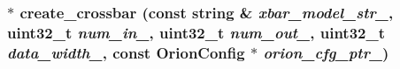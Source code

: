 \hypertarget{classCrossbar_afc72742e1283ea982ebdc5ef6ece81d2}{
\subsubsection[{create\_\-crossbar}]{ $\ast$ create\_\-crossbar (const string \& {\em xbar\_\-model\_\-str\_\-}, \/  {\bf uint32\_\-t} {\em num\_\-in\_\-}, \/  {\bf uint32\_\-t} {\em num\_\-out\_\-}, \/  {\bf uint32\_\-t} {\em data\_\-width\_\-}, \/  const {\bf OrionConfig} $\ast$ {\em orion\_\-cfg\_\-ptr\_\-})}}
\label{classCrossbar_afc72742e1283ea982ebdc5ef6ece81d2}



